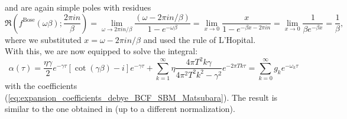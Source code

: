 and are again simple poles with residues
\begin{equation*}
    \Re\left(
        f^\text{Bose}(\omega\beta); \frac{2\pi in}{\beta}
    \right) = \lim_{\omega \rightarrow 2\pi in/\beta} \frac{(\omega-2\pi in/\beta)}{1-e^{-\omega\beta}} =
    \lim_{x\rightarrow0}\frac{x}{1-e^{-\beta x-2\pi i n}} = \lim_{x\rightarrow0} \frac{1}{\beta e^{-\beta x}} = \frac{1}{\beta},
\end{equation*}
where we substituted $x = \omega - 2\pi i n/\beta$ and used the rule of L'Hopital.\\
With this, we are now equipped to solve the integral:
\begin{equation*}
    \alpha(\tau) = \frac{\eta\gamma}{2} e^{-\gamma\tau}\left[\cot(\gamma\beta)-i\right]e^{-\gamma\tau}
    + \sum_{k=1}^{\infty} \eta\frac{4\pi T^2k\gamma}{4\pi^2T^2k^2-\gamma^2} e^{-2\pi Tk\tau} = \sum_{k=0}^{\infty} g_ke^{-\omega_k\tau}
\end{equation*}
with the coefficients (\ref{eq:expansion_coefficients_debye_BCF_SBM_Matsubara}).
The result is similar to the one obtained in \cite{Qiang:2009} (up to a different normalization).
  
